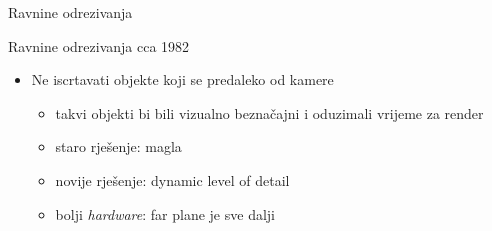 \documentclass[9pt]{beamer}
\begin{document}
\begin{frame}{Ravnine odrezivanja}
	\begin{block}{Ravnine odrezivanja cca 1982}
		\begin{itemize}
			\item Ne iscrtavati objekte koji se predaleko od kamere
			\begin{itemize}
				\item takvi objekti bi bili vizualno beznačajni i oduzimali vrijeme za render
				\item staro rješenje: magla
				\item novije rješenje: dynamic level of detail
				\item bolji \textsl{hardware}: far plane je sve dalji
			\end{itemize}
		\end{itemize}
	\end{block}
	
\end{frame}
\end{document}
